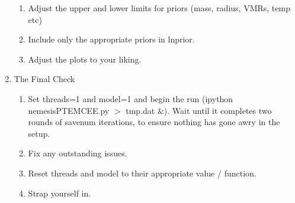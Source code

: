\documentclass[11pt, a4paper,titlepage]{report}
\begin{document}
\begin{enumerate}
\begin{enumerate}
\item Adjust the upper and lower limits for priors (mass, radius, VMRs, temp etc)
\item Include only the appropriate priors in lnprior. 
\item Adjust the plots to your liking.
\end{enumerate}
\item The Final Check
\begin{enumerate}
\item Set threads=1 and model=1 and begin the run (ipython nemesisPTEMCEE.py $>$ tmp.dat \&). Wait until it completes two rounds of savenum iterations, to ensure nothing has gone awry in the setup. 
\item Fix any outstanding issues.
\item Reset threads and model to their appropriate value / function.
\item Strap yourself in.
\end{enumerate}
\end{enumerate}

\newpage


\end{document}
